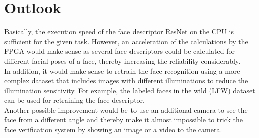 \documentclass[%
a4paper,
twoside,
openany,
dvipsnames
]
{report}
\begin{document}
\chapter{Outlook}
Basically, the execution speed of the face descriptor ResNet on the CPU is sufficient for the given task. However, an acceleration of the calculations by the FPGA would make sense as several face descriptors could be calculated for different facial poses of a face, thereby increasing the reliability considerably. \\
In addition, it would make sense to retrain the face recognition using a more complex dataset that includes images with different illuminations to reduce the illumination sensitivity. For example, the labeled faces in the wild (LFW) dataset can be used for retraining the face descriptor. \\
Another possible improvement would be to use an additional camera to see the face from a different angle and thereby make it almost impossible to trick the face verification system by showing an image or a video to the camera. 

	
	
	

	
	
\end{document}
